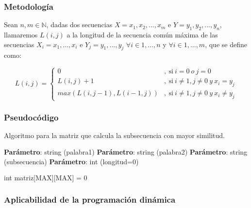 \documentclass[13pt]{beamer}
\begin{document}
    \begin{frame}
        \frametitle{Metodología}
        Sean $n,m \in \mathbb{N}$, dadas dos secuencias $X = { x_1,x_2,...,x_m}$ e $Y = { y_1,y_2,...,y_n}$, llamaremos $L(i,j)$ a la 
        longitud de la secuencia común máxima de las secuencias $X_i = {x_1,...,x_i}$ e $Y_j = {y_1,...,y_j}$ $\forall i \in {1,...,n} $ y $\forall i \in {1,...,m}$, 
        que se define como:  

        \[
        L(i,j) = 
        \left \{
            \begin{aligned}
            0 &,\ \text{si} \ i = 0 \ o \ j = 0\\
            L(i,j) + 1 &,\ \text{si} \ i \neq  1 , j \neq  0 \ y \ x_i = y_j\\
            max(L(i,j-1) , L(i-1,j))&,\ \text{si} \ i \neq 1 , j \neq 0 \ y \ x_i \neq y_j
            \end{aligned}
        \right .
        \]
    \end{frame}



    \begin{frame}
        \frametitle{Pseudocódigo}
    
        \begin{algorithm}[H]
            \caption{Algoritmo para la matriz que calcula la subsecuencia con mayor similitud.}\label{alg:simil}
            \begin{minipage}{0.92\textwidth}
            \textbf{Parámetro}: string (palabra1)
            \textbf{Parámetro}: string (palabra2)
            \textbf{Parámetro}: string (subsecuencia)
            \textbf{Parámetro}: int (longitud=0)
            \end{minipage}

            int matriz[MAX][MAX] = {0}

             {
                 {
                }
            }
        \end{algorithm}
    \end{frame}

    \begin{frame}
		\frametitle{Aplicabilidad de la programación dinámica}

	\end{frame}
\end{document}
